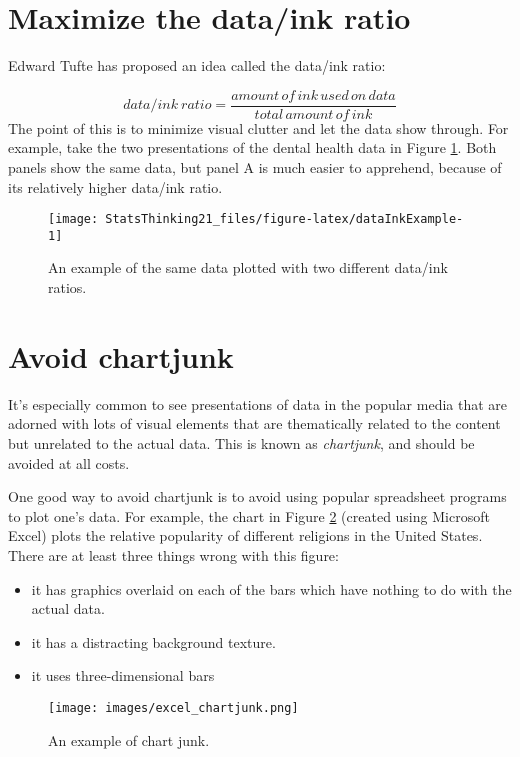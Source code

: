 \documentclass[]{book}
\providecommand{\tightlist}{%
  \setlength{\itemsep}{0pt}\setlength{\parskip}{0pt}}
\theoremstyle{definition}
\theoremstyle{definition}
\theoremstyle{definition}
\theoremstyle{remark}
\begin{document}
\section{Maximize the data/ink ratio}\label{maximize-the-dataink-ratio}

Edward Tufte has proposed an idea called the data/ink ratio:

\[
data/ink\ ratio = \frac{amount\, of\, ink\, used\, on\, data}{total\, amount\, of\, ink}
\] The point of this is to minimize visual clutter and let the data show
through. For example, take the two presentations of the dental health
data in Figure \ref{fig:dataInkExample}. Both panels show the same data,
but panel A is much easier to apprehend, because of its relatively
higher data/ink ratio.

\begin{figure}
\texttt{[image: StatsThinking21\_files/figure-latex/dataInkExample-1]} \caption{An example of the same data plotted with two different data/ink ratios.}\label{fig:dataInkExample}
\end{figure}

\section{Avoid chartjunk}\label{avoid-chartjunk}

It's especially common to see presentations of data in the popular media
that are adorned with lots of visual elements that are thematically
related to the content but unrelated to the actual data. This is known
as \emph{chartjunk}, and should be avoided at all costs.

One good way to avoid chartjunk is to avoid using popular spreadsheet
programs to plot one's data. For example, the chart in Figure
\ref{fig:chartJunk} (created using Microsoft Excel) plots the relative
popularity of different religions in the United States. There are at
least three things wrong with this figure:

\begin{itemize}
\tightlist
\item
  it has graphics overlaid on each of the bars which have nothing to do
  with the actual data.
\item
  it has a distracting background texture.
\item
  it uses three-dimensional bars
\end{itemize}

\begin{figure}
\centering
\texttt{[image: images/excel\_chartjunk.png]}
\caption{\label{fig:chartJunk}An example of chart junk.}
\end{figure}
\end{document}
